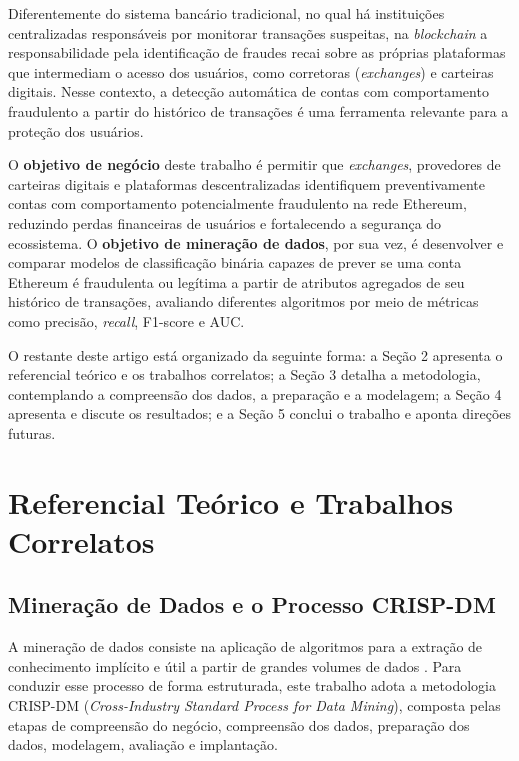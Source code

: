 \documentclass[12pt]{article}
\begin{document}
Diferentemente do sistema bancário tradicional, no qual há instituições
centralizadas responsáveis por monitorar transações suspeitas, na
\textit{blockchain} a responsabilidade pela identificação de fraudes
recai sobre as próprias plataformas que intermediam o acesso dos
usuários, como corretoras (\textit{exchanges}) e carteiras digitais.
Nesse contexto, a detecção automática de contas com comportamento
fraudulento a partir do histórico de transações é uma ferramenta
relevante para a proteção dos usuários.

O \textbf{objetivo de negócio} deste trabalho é permitir que
\textit{exchanges}, provedores de carteiras digitais e plataformas
descentralizadas identifiquem preventivamente contas com comportamento
potencialmente fraudulento na rede Ethereum, reduzindo perdas
financeiras de usuários e fortalecendo a segurança do ecossistema. O
\textbf{objetivo de mineração de dados}, por sua vez, é desenvolver e
comparar modelos de classificação binária capazes de prever se uma
conta Ethereum é fraudulenta ou legítima a partir de atributos
agregados de seu histórico de transações, avaliando diferentes
algoritmos por meio de métricas como precisão, \textit{recall},
F1-score e AUC.

O restante deste artigo está organizado da seguinte forma: a Seção 2
apresenta o referencial teórico e os trabalhos correlatos; a Seção 3
detalha a metodologia, contemplando a compreensão dos dados, a
preparação e a modelagem; a Seção 4 apresenta e discute os resultados;
e a Seção 5 conclui o trabalho e aponta direções futuras.

\section{Referencial Teórico e Trabalhos Correlatos}

\subsection{Mineração de Dados e o Processo CRISP-DM}

A mineração de dados consiste na aplicação de algoritmos para a
extração de conhecimento implícito e útil a partir de grandes volumes
de dados \cite{fayyad1996}. Para conduzir esse processo de forma
estruturada, este trabalho adota a metodologia CRISP-DM
(\textit{Cross-Industry Standard Process for Data Mining}), composta
pelas etapas de compreensão do negócio, compreensão dos dados,
preparação dos dados, modelagem, avaliação e implantação.
\end{document}
